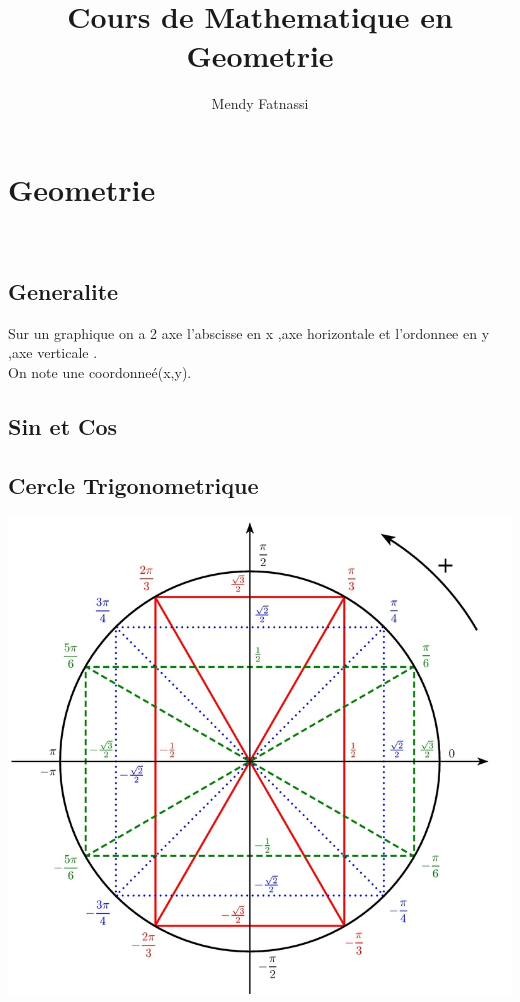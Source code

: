 \documentclass[a4paper,8pt,openany]{book}
\author{Mendy Fatnassi}
\title{Cours de Mathematique en Geometrie}
\begin{document}
\maketitle
\tableofcontents

\chapter{Geometrie}
\\
\section{Generalite}
Sur un graphique on a 2 axe l'abscisse en x ,axe horizontale et l'ordonnee en y ,axe verticale .\\
On note une coordonne\'e(x,y).\\


\section{Sin et Cos}



\section{Cercle Trigonometrique}
\includegraphics[width=1\textwidth, center]{cercle_trigo.jpg}
\\
\end{document}
